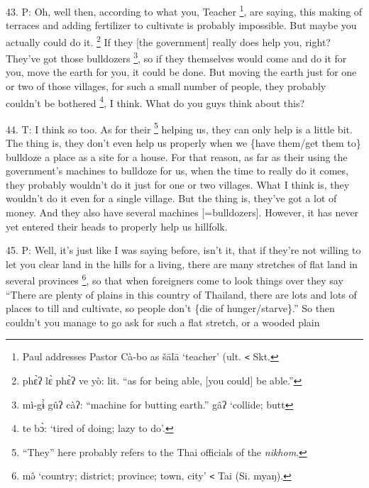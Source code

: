 43. P: Oh, well then, according to what you, Teacher \footnote{Paul addresses Pastor Cà-bo as šālā `teacher' (ult. \texttt{<} Skt.}, are saying, this making
of terraces and adding fertilizer to cultivate is probably impossible. But maybe
you actually could do it. \footnote{phɛ̀ʔ lɛ̀ phɛ̀ʔ ve yò: lit. ``as for being able, [you could] be able.''} If they [the government] really does help you, right?
They've got those bulldozers \footnote{mì-gɨ̀ gûʔ càʔ: ``machine for butting earth.'' gâʔ `collide; butt}, so if they themselves would come and do it for
you, move the earth for you, it could be done. But moving the earth just for one
or two of those villages, for such a small number of people, they probably couldn't
be bothered \footnote{te bɔ̀: `tired of doing; lazy to do'.}, I think. What do you guys think about this?

44. T: I think so too. As for their \footnote{``They'' here probably refers to the Thai officials of the \textit{nikhom}.} helping us, they can only help is a little
bit. The thing is, they don't even help us properly when we \{have them/get them
to\} bulldoze a place as a site for a house. For that reason, as far as their using
the government's machines to bulldoze for us, when the time to really do it comes,
they probably wouldn't do it just for one or two villages. What I think is, they
wouldn't do it even for a single village. But the thing is, they've got a lot of
money. And they also have several machines [=bulldozers]. However, it has never
yet entered their heads to properly help us hillfolk.

45. P: Well, it's just like I was saying before, isn't it, that if they're not
willing to let you clear land in the hills for a living, there are many stretches
of flat land in several provinces \footnote{mə̂ `country; district; province; town, city' \texttt{<} Tai (Si. myaŋ).}, so that when foreigners come to look things
over they say ``There are plenty of plains in this country of Thailand, there are
lots and lots of places to till and cultivate, so people don't \{die of hunger/starve\}.''
So then couldn't you manage to go ask for such a flat stretch, or a wooded plain
